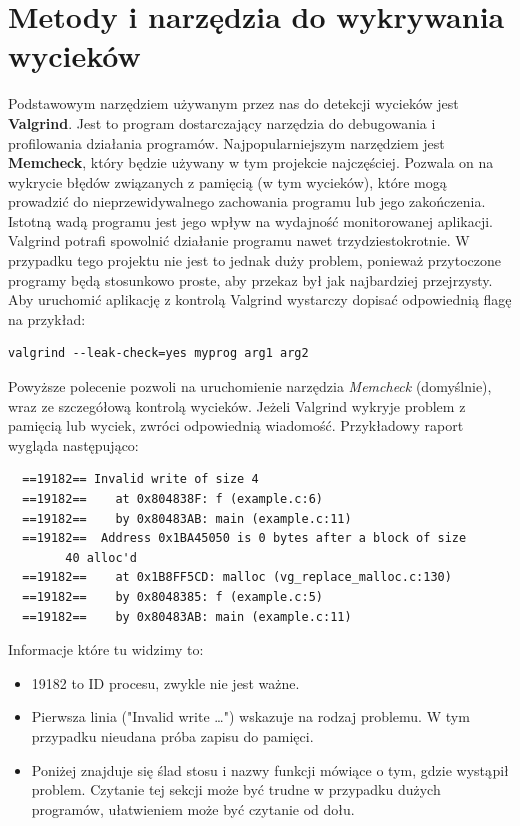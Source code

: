 \documentclass[12pt]{article}
\begin{document}
\section{Metody i narzędzia do wykrywania wycieków}
Podstawowym narzędziem używanym przez nas do detekcji wycieków jest \textbf{Valgrind}. Jest to program dostarczający narzędzia do debugowania i profilowania działania programów. Najpopularniejszym narzędziem jest \textbf{Memcheck}, który będzie używany w tym projekcie najczęściej. Pozwala on na wykrycie błędów związanych z pamięcią (w tym wycieków), które mogą prowadzić do nieprzewidywalnego zachowania programu lub jego zakończenia. Istotną wadą programu jest jego wpływ na wydajność monitorowanej aplikacji. Valgrind potrafi spowolnić działanie programu nawet trzydziestokrotnie. W przypadku tego projektu nie jest to jednak duży problem, ponieważ przytoczone programy będą stosunkowo proste, aby przekaz był jak najbardziej przejrzysty.\\
Aby uruchomić aplikację z kontrolą Valgrind wystarczy dopisać odpowiednią flagę na przykład:
\begin{lstlisting}
valgrind --leak-check=yes myprog arg1 arg2
\end{lstlisting}
Powyższe polecenie pozwoli na uruchomienie narzędzia \textit{Memcheck} (domyślnie), wraz ze szczegółową kontrolą wycieków. Jeżeli Valgrind wykryje problem z pamięcią lub wyciek, zwróci odpowiednią wiadomość. Przykładowy raport wygląda następująco:
\begin{lstlisting}
  ==19182== Invalid write of size 4
  ==19182==    at 0x804838F: f (example.c:6)
  ==19182==    by 0x80483AB: main (example.c:11)
  ==19182==  Address 0x1BA45050 is 0 bytes after a block of size 
		40 alloc'd
  ==19182==    at 0x1B8FF5CD: malloc (vg_replace_malloc.c:130)
  ==19182==    by 0x8048385: f (example.c:5)
  ==19182==    by 0x80483AB: main (example.c:11)
\end{lstlisting}
\newpage
Informacje które tu widzimy to:
\begin{itemize}
  \item 19182 to ID procesu, zwykle nie jest ważne.
  \item Pierwsza linia ("Invalid write \ldots ") wskazuje na rodzaj problemu. W tym przypadku nieudana próba zapisu do pamięci.
  \item Poniżej znajduje się ślad stosu i nazwy funkcji mówiące o tym, gdzie wystąpił problem. Czytanie tej sekcji może być trudne w przypadku dużych programów, ułatwieniem może być czytanie od dołu.
\end{itemize}
\end{document}
